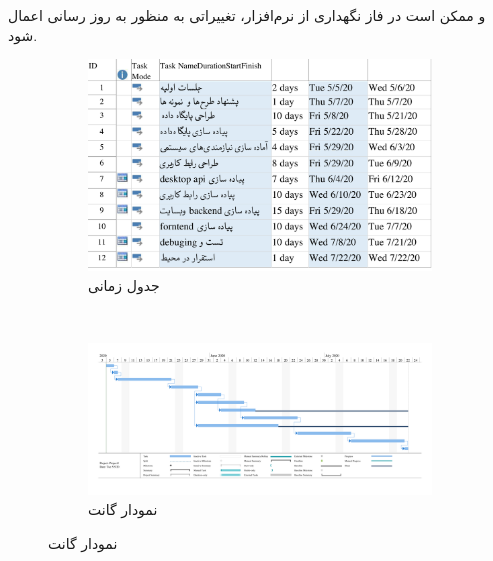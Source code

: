 \documentclass[a4paper,12pt]{report}
\begin{document}
	و ممکن است در فاز نگهداری از نرم‌افزار، تغییراتی به منظور  به روز رسانی اعمال شود.
	\begin{figure}[!h]
		\label{fig1:sec5:chap1}
		\begin{flushleft}	
			\qquad\qquad		
			\begin{subfigure}[t]{0.5\textwidth}
				\includegraphics[width=\textwidth]{diagrams/gantChart_timeTable.pdf}
				\caption{جدول زمانی}
				\label{subfig2:fig1:sec5:chap1}
			\end{subfigure}\\
			\begin{subfigure}[t]{\textwidth}
				\includegraphics[width=\textwidth]{diagrams/gantchart.pdf}
				\caption{نمودار گانت}
				\label{subfig1:fig1:sec5:chap1}
			\end{subfigure}
		\end{flushleft}
	\end{figure}

	\pagebreak
\end{document}
